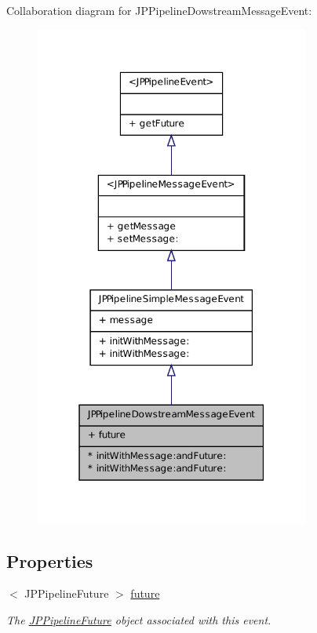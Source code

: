 Collaboration diagram for JPPipelineDowstreamMessageEvent:\nopagebreak
\begin{figure}[H]
\begin{center}
\leavevmode
\includegraphics[width=256pt]{a00128}
\end{center}
\end{figure}
\subsection*{Properties}
\begin{DoxyCompactItemize}
\item 
\hypertarget{a00022_ab91b689523e7d730de35da0c2a892b8d}{
$<$ JPPipelineFuture $>$ \hyperlink{a00022_ab91b689523e7d730de35da0c2a892b8d}{future}}
\label{a00022_ab91b689523e7d730de35da0c2a892b8d}

\begin{DoxyCompactList}\small\item\em The \hyperlink{a00088}{JPPipelineFuture} object associated with this event. \item\end{DoxyCompactList}\end{DoxyCompactItemize}
